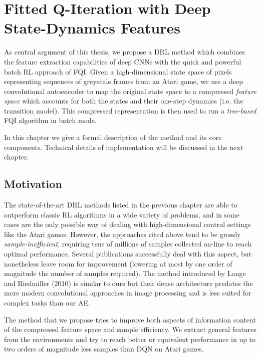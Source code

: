 \chapter{Fitted Q-Iteration with Deep State-Dynamics Features}
\label{ch3_setup}
\thispagestyle{empty}

\vspace{0.5cm}

As central argument of this thesis, we propose a DRL method which 
combines the feature extraction capabilities of deep CNNs with the quick 
and powerful batch RL approach of FQI. 
Given a high-dimensional state space of pixels representing sequences of 
greyscale frames from an Atari game, we use a deep convolutional autoencoder 
to map the original state space to a compressed \textit{feature space} which 
accounts for both the states and their one-step dynamics (i.e. the transition 
model). This compressed representation is then used to run a \textit{tree-based}
FQI algorithm in batch mode.

In this chapter we give a formal description of the method and its core 
components. Technical details of implementation will be discussed in the next
chapter.

\section{Motivation}
The state-of-the-art DRL methods listed in the previous chapter are able to 
outperform classic RL algorithms in a wide variety of problems, and in some 
cases are the only possible way of dealing with high-dimensional control 
settings like the Atari games. 
However, the approaches cited above tend to be grossly 
\textit{sample-inefficient}, requiring tens of millions of samples collected
on-line to reach optimal performance. Several publications successfully deal 
with this aspect, but nonetheless leave room for improvement (lowering at most
by one order of magnitude the number of samples required).
The method introduced by Lange and Riedmiller (2010) \cite{lange2010deep} is 
similar to ours but their dense architecture predates the more modern 
convolutional approaches in image processing and is less suited for complex
tasks than our AE.

The method that we propose tries to improve both aspects of information content
of the compressed feature space and sample efficiency. We extract general 
features from the environments and try to reach better or equivalent performance
in up to two orders of magnitude less samples than DQN on Atari games.


